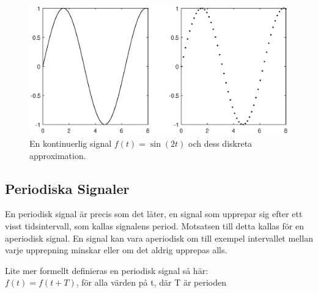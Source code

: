 \documentclass{article}
\begin{document}
\begin{figure}[ht]
\centerline{\includegraphics[scale=0.55]{diskretisering.eps}}
\caption{En kontinuerlig signal $f(t) = \sin(2 t)$ och dess diskreta approximation.}
\label{}
\end{figure}

\subsection{Periodiska Signaler}
En periodisk signal är precis som det låter, en signal som upprepar sig efter ett visst tidsintervall, som kallas signalens period. Motsatsen till detta kallas för en aperiodisk signal.
En signal kan vara aperiodisk om till exempel intervallet mellan varje
upprepning minskar eller om det aldrig upprepas alls.

Lite mer formellt definieras en periodisk signal så här:\\
$f(t) = f(t+T)$, för alla värden på t, där T är perioden
\end{document}
